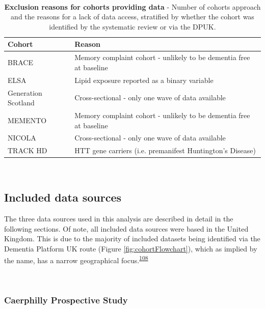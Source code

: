 \documentclass[a4paper, twoside]{templates/ociamthesis}
\begin{document}
~\\




\begin{table}[H]

\caption[Exclusion reasons for cohorts providing data]{\label{tab:dataExcluded-table}\textbf{Exclusion reasons for cohorts providing data} - Number of cohorts approach and the reasons for a lack of data access, stratified by whether the cohort was identified by the systematic review or via the DPUK.}
\centering
\begin{tabular}[t]{>{\raggedright\arraybackslash}p{12em}>{\raggedright\arraybackslash}p{20em}}
\toprule
\textbf{Cohort} & \textbf{Reason}\\
\midrule
BRACE & Memory complaint cohort - unlikely to be dementia free at baseline\\
\midrule
ELSA & Lipid exposure reported as a binary variable\\
\midrule
Generation Scotland & Cross-sectional - only one wave of data available\\
\midrule
MEMENTO & Memory complaint cohort - unlikely to be dementia free at baseline\\
\midrule
NICOLA & Cross-sectional - only one wave of data available\\
\midrule
\addlinespace
TRACK HD & HTT gene carriers (i.e. premanifest Huntington's Disease)\\
\bottomrule
\end{tabular}
\end{table}

~

\hypertarget{included-data-sources}{%
\subsection{Included data sources}\label{included-data-sources}}

The three data sources used in this analysis are described in detail in the following sections. Of note, all included data sources were based in the United Kingdom. This is due to the majority of included datasets being identified via the Dementia Platform UK route (Figure \ref{fig:cohortFlowchart}), which as implied by the name, has a narrow geographical focus.\textsuperscript{\protect\hyperlink{ref-bauermeister2020}{108}}

~

\hypertarget{caerphilly-prospective-study}{%
\subsubsection{Caerphilly Prospective Study}\label{caerphilly-prospective-study}}
\end{document}
